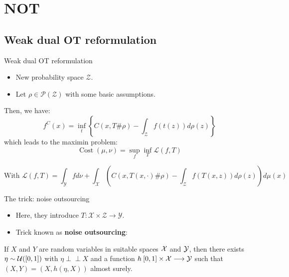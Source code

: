 \documentclass[aspectratio=169]{beamer}
\DeclareMathOperator*{\Cost}{\text{Cost}}
\newcommand{\indep}{\perp \!\!\! \perp}
\begin{document}
\section{NOT}

\subsection{Weak dual OT reformulation}
\begin{frame}{Weak dual OT reformulation}
    \begin{itemize}
        \item New probability space $\mathcal{Z}$.
        \item Let $\rho\in \mathcal{P}(\mathcal{Z})$ with some basic assumptions.
    \end{itemize}
    Then, we have:
    \begin{equation}
        f^C(x)=\inf_t \left\{C(x, T\#\rho)-\int_{\mathcal{Z}}f(t(z))d\rho(z)\right\}
    \end{equation}
    which leads to the maximin problem:
    \begin{equation}
        \Cost(\mu,\nu) = \sup_{f} \inf_{T} \mathcal{L}(f,T)
    \end{equation}

    $$\text{With }\mathcal{L}(f,T) = \int_{\mathcal{Y}}fd\nu + \int_{\mathcal{X}} \left( C(x, T(x,\cdot)\#\rho)-\int_{\mathcal{Z}}f(T(x,z))d\rho(z)\right)d\mu(x)$$

\end{frame}

\begin{frame}{The trick: noise outsourcing}
    \begin{itemize}
        \item Here, they introduce $T:\mathcal{X}\times\mathcal{Z}\to\mathcal{Y}$.
        \item Trick known as \textbf{noise outsourcing}:
    \end{itemize}

    \begin{theorem}
        If $X$ and $Y$ are random variables in suitable spaces ${\cal X}$ and ${\cal Y}$, then there exists $\eta\sim {\cal U}([0,1])$ with $\eta \indep X$ and a function $h\: [0, 1]\times {\cal X} \longrightarrow {\cal Y}$ such that $(X, Y) = (X, h(\eta, X))$ almost surely.
    \end{theorem}
\end{frame}
\end{document}
